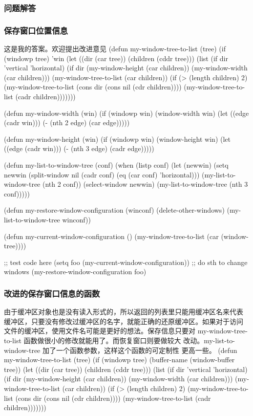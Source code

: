 \documentclass[11pt]{ctexart}
\begin{document}
{{{{\subsubsection{问题解答}
\label{sec:orge514fce}
\subsubsection{保存窗口位置信息}
\label{sec:org9deaea3}
这是我的答案。欢迎提出改进意见
(defun my-window-tree-to-list (tree)
(if (windowp tree)
'win
(let ((dir (car tree))
(children (cddr tree)))
(list (if dir 'vertical 'horizontal)
(if dir
(my-window-height (car children))
(my-window-width (car children)))
(my-window-tree-to-list (car children))
(if (> (length children) 2)
(my-window-tree-to-list (cons dir (cons nil (cdr children))))
(my-window-tree-to-list (cadr children)))))))

(defun my-window-width (win)
(if (windowp win)
(window-width win)
(let ((edge (cadr win)))
(- (nth 2 edge) (car edge)))))

(defun my-window-height (win)
(if (windowp win)
(window-height win)
(let ((edge (cadr win)))
(- (nth 3 edge) (cadr edge)))))

(defun my-list-to-window-tree (conf)
(when (listp conf)
(let (newwin)
(setq newwin (split-window nil (cadr conf)
(eq (car conf) 'horizontal)))
(my-list-to-window-tree (nth 2 conf))
(select-window newwin)
(my-list-to-window-tree (nth 3 conf)))))

(defun my-restore-window-configuration (winconf)
(delete-other-windows)
(my-list-to-window-tree winconf))

(defun my-current-window-configuration ()
(my-window-tree-to-list (car (window-tree))))

;; test code here
(setq foo (my-current-window-configuration))
;; do sth to change windows
(my-restore-window-configuration foo)
\subsubsection{改进的保存窗口信息的函数}
\label{sec:org1a4ab2a}
由于缓冲区对象也是没有读入形式的，所以返回的列表里只能用缓冲区名来代表 缓冲区，只要没有修改过缓冲区的名字，就能正确的还原缓冲区。如果对于访问 文件的缓冲区，使用文件名可能是更好的想法。保存信息只要对 my-window-tree-to-list 函数做很小的修改就能用了。而恢复窗口则要做较大 改动。my-list-to-window-tree 加了一个函数参数，这样这个函数的可定制性 更高一些。
(defun my-window-tree-to-list (tree)
(if (windowp tree)
(buffer-name (window-buffer tree))
(let ((dir (car tree))
(children (cddr tree)))
(list (if dir 'vertical 'horizontal)
(if dir
(my-window-height (car children))
(my-window-width (car children)))
(my-window-tree-to-list (car children))
(if (> (length children) 2)
(my-window-tree-to-list (cons dir (cons nil (cdr children))))
(my-window-tree-to-list (cadr children)))))))

}}}}
\end{document}
